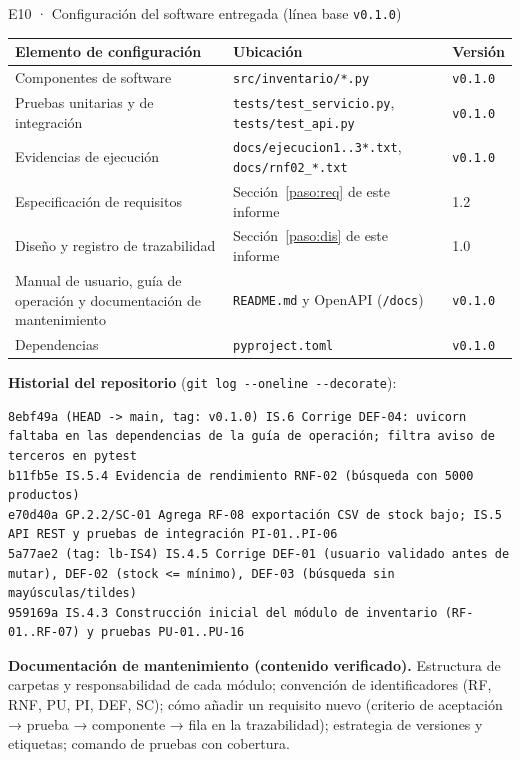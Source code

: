 \documentclass[11pt,a4paper]{article}
\newcommand{\cod}[1]{\texttt{\small #1}}
\begin{document}
\begin{evidencia}{E10 · Configuración del software entregada (línea base \cod{v0.1.0})}
\small
\begin{tabularx}{\linewidth}{@{}P{4.2cm} L l@{}}
\toprule
\textbf{Elemento de configuración} & \textbf{Ubicación} & \textbf{Versión} \\
\midrule
Componentes de software & \cod{src/inventario/*.py} & \cod{v0.1.0} \\
Pruebas unitarias y de integración & \cod{tests/test\_servicio.py}, \cod{tests/test\_api.py} & \cod{v0.1.0} \\
Evidencias de ejecución & \cod{docs/ejecucion1..3*.txt}, \cod{docs/rnf02\_*.txt} & \cod{v0.1.0} \\
Especificación de requisitos & Sección~\ref{paso:req} de este informe & 1.2 \\
Diseño y registro de trazabilidad & Sección~\ref{paso:dis} de este informe & 1.0 \\
Manual de usuario, guía de operación y documentación de mantenimiento & \cod{README.md} y OpenAPI (\cod{/docs}) & \cod{v0.1.0} \\
Dependencias & \cod{pyproject.toml} & \cod{v0.1.0} \\
\bottomrule
\end{tabularx}

\vspace{0.3cm}
\textbf{Historial del repositorio} (\cod{git log -{}-oneline -{}-decorate}):
\begin{lstlisting}[style=consola]
8ebf49a (HEAD -> main, tag: v0.1.0) IS.6 Corrige DEF-04: uvicorn faltaba en las dependencias de la guía de operación; filtra aviso de terceros en pytest
b11fb5e IS.5.4 Evidencia de rendimiento RNF-02 (búsqueda con 5000 productos)
e70d40a GP.2.2/SC-01 Agrega RF-08 exportación CSV de stock bajo; IS.5 API REST y pruebas de integración PI-01..PI-06
5a77ae2 (tag: lb-IS4) IS.4.5 Corrige DEF-01 (usuario validado antes de mutar), DEF-02 (stock <= mínimo), DEF-03 (búsqueda sin mayúsculas/tildes)
959169a IS.4.3 Construcción inicial del módulo de inventario (RF-01..RF-07) y pruebas PU-01..PU-16
\end{lstlisting}

\textbf{Documentación de mantenimiento (contenido verificado).} Estructura de carpetas y responsabilidad de cada módulo; convención de identificadores (RF, RNF, PU, PI, DEF, SC); cómo añadir un requisito nuevo (criterio de aceptación → prueba → componente → fila en la trazabilidad); estrategia de versiones y etiquetas; comando de pruebas con cobertura.
\end{evidencia}
\end{document}
